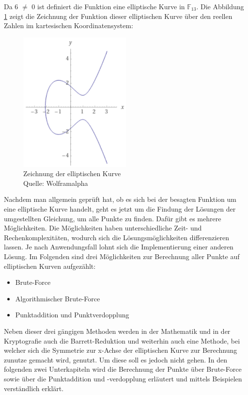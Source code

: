 Da 6 $\neq$ 0 ist definiert die Funktion eine elliptische Kurve in $\mathbb{F}_{13}$. Die Abbildung \ref{fig:kurve_beispiel_1_punktberechnung} zeigt die Zeichnung der Funktion dieser elliptischen Kurve über den reellen Zahlen im kartesischen Koordinatensystem: 

\begin{figure}[H]
    \centering
    \includegraphics[width=0.5\textwidth]{grafiken/kurve_beispiel_1_punktberechnung.png}
    \caption[Zeichnung der elliptischen Kurve]{Zeichnung der elliptischen Kurve \\ Quelle: Wolframalpha}
    \label{fig:kurve_beispiel_1_punktberechnung}
\end{figure}

Nachdem man allgemein geprüft hat, ob es sich bei der besagten Funktion um eine elliptische Kurve handelt, geht es jetzt um die Findung der Lösungen der umgestellten Gleichung, um alle Punkte zu finden. Dafür gibt es mehrere Möglichkeiten. Die Möglichkeiten haben unterschiedliche Zeit- und Rechenkomplexitäten, wodurch sich die Lösungsmöglichkeiten differenzieren lassen. Je nach Anwendungsfall lohnt sich die Implementierung einer anderen Lösung. Im Folgenden sind drei Möglichkeiten zur Berechnung aller Punkte auf elliptischen Kurven aufgezählt:

\begin{itemize}
\item Brute-Force
\item Algorithmischer Brute-Force
\item Punktaddition und Punktverdopplung
\end{itemize}

Neben dieser drei gängigen Methoden werden in der Mathematik und in der Kryptografie auch die Barrett-Reduktion und weiterhin auch eine Methode, bei welcher sich die Symmetrie zur x-Achse der elliptischen Kurve zur Berechnung zunutze gemacht wird, genutzt. Um diese soll es jedoch nicht gehen. In den folgenden zwei Unterkapiteln wird die Berechnung der Punkte über Brute-Force sowie über die Punktaddition und -verdopplung erläutert und mittels Beispielen verständlich erklärt.

